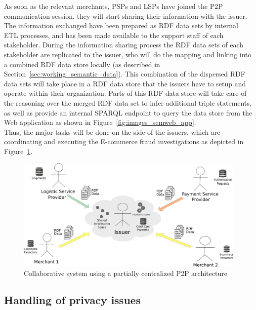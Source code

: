 As soon as the relevant merchants, \gls{PSP}s and \gls{LSP}s have joined the \gls{P2P} communication session, they will start sharing their information with the issuer. The information exchanged have been prepared as \gls{RDF} data sets by internal \gls{ETL} processes, and has been made available to the support staff of each stakeholder. During the information sharing process the \gls{RDF} data sets of each stakeholder are replicated to the issuer, who will do the mapping and linking into a combined \gls{RDF} data store locally (as described in Section~\ref{sec:working_semantic_data}). This combination of the dispersed \gls{RDF} data sets will take place in a \gls{RDF} data store that the issuers have to setup and operate within their organization. Parts of this \gls{RDF} data store will take care of the reasoning over the merged \gls{RDF} data set to infer additional triple statements, as well as provide an internal \gls{SPARQL} endpoint to query the data store from the Web application as shown in Figure~\ref{fig:images_semweb_app}. \\

Thus, the major tasks will be done on the side of the issuers, which are coordinating and executing the \gls{E-commerce} fraud investigations as depicted in Figure~\ref{fig:images_p2p_centralized}.\@

\begin{figure}[H]
	\centering
		\includegraphics[width=0.9\columnwidth]{images/system_P2P_centralized.pdf}
	\caption{Collaborative system using a partially centralized \gls{P2P} architecture}
\label{fig:images_p2p_centralized}
\end{figure}


\subsection{Handling of privacy issues}
\label{subsec:p2p_partially_issuer_privacy}

